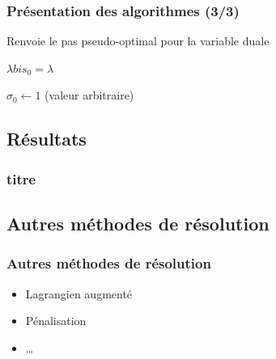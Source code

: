 \documentclass[11pt,envcountsect,aspectratio=169]{beamer} %
\newcommand{\R}{\mathbb{R}}
\begin{document}
\begin{frame}
    \frametitle{Présentation des algorithmes (3/3)}   
    
    \begin{algorithm}[H]
        \caption{Renvoie le pas pseudo-optimal pour la variable duale}
        \label{algo:duale}
    
        \KwIn{$f \in \R^n$ et $\lambda \in \R$}
        
        $\lambda bis_0 = \lambda$

        $\sigma_0 \leftarrow 1$ (valeur arbitraire)

    
    \end{algorithm}
    
\end{frame}

\subsection{Résultats}

\begin{frame}
    \frametitle{titre}

    

\end{frame}





\subsection{Autres méthodes de résolution}

\begin{frame}
    \frametitle{Autres méthodes de résolution}

    \begin{itemize}
        \item Lagrangien augmenté
        \item Pénalisation
        \item \dots
    \end{itemize}

\end{frame}
\end{document}
